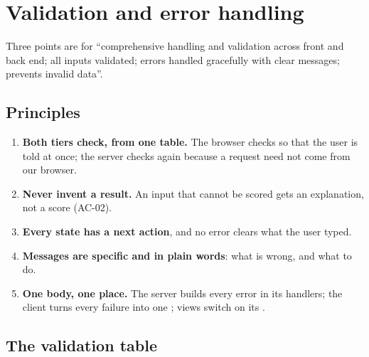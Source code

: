 \section{Validation and error handling}
\label{sec:errors}

Three points are for ``comprehensive handling and validation across front and back end; all inputs
validated; errors handled gracefully with clear messages; prevents invalid data''.

\subsection{Principles}

\begin{enumerate}
  \item \textbf{Both tiers check, from one table.} The browser checks so that the user is told at
    once; the server checks again because a request need not come from our browser.
  \item \textbf{Never invent a result.} An input that cannot be scored gets an explanation, not a
    score (AC-02).
  \item \textbf{Every state has a next action}, and no error clears what the user typed.
  \item \textbf{Messages are specific and in plain words}: what is wrong, and what to do.
  \item \textbf{One body, one place.} The server builds every error in its handlers; the client
    turns every failure into one ; views switch on its .
\end{enumerate}

\subsection{The validation table}
\label{sec:validation}

